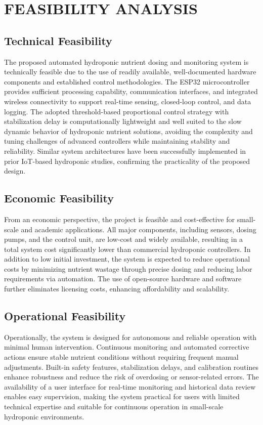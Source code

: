 \chapter{FEASIBILITY ANALYSIS}

\section{Technical Feasibility}
 The proposed automated hydroponic nutrient dosing and monitoring system is technically feasible due to the use of readily available, well-documented hardware components and established control methodologies. The ESP32 microcontroller provides sufficient processing capability, communication interfaces, and integrated wireless connectivity to support real-time sensing, closed-loop control, and data logging. The adopted threshold-based proportional control strategy with stabilization delay is computationally lightweight and well suited to the slow dynamic behavior of hydroponic nutrient solutions, avoiding the complexity and tuning challenges of advanced controllers while maintaining stability and reliability. Similar system architectures have been successfully implemented in prior IoT-based hydroponic studies, confirming the practicality of the proposed design.
 
\section{Economic Feasibility}
 From an economic perspective, the project is feasible and cost-effective for small-scale and academic applications. All major components, including sensors, dosing pumps, and the control unit, are low-cost and widely available, resulting in a total system cost significantly lower than commercial hydroponic controllers. In addition to low initial investment, the system is expected to reduce operational costs by minimizing nutrient wastage through precise dosing and reducing labor requirements via automation. The use of open-source hardware and software further eliminates licensing costs, enhancing affordability and scalability.
 
\section{Operational Feasibility}
 Operationally, the system is designed for autonomous and reliable operation with minimal human intervention. Continuous monitoring and automated corrective actions ensure stable nutrient conditions without requiring frequent manual adjustments. Built-in safety features, stabilization delays, and calibration routines enhance robustness and reduce the risk of overdosing or sensor-related errors. The availability of a user interface for real-time monitoring and historical data review enables easy supervision, making the system practical for users with limited technical expertise and suitable for continuous operation in small-scale hydroponic environments.